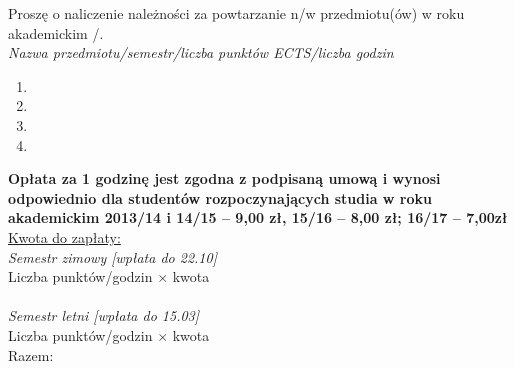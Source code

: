 \documentclass{wmiisubmission}
\begin{document}
\cracowdate
{}
\studentaddress
\addressee[-1em]{\piotrniemiec}

\vskip 1.5cm

Proszę o naliczenie należności za powtarzanie n/w przedmiotu(ów) w roku\\
akademickim \fillField{1cm}/\fillField{1cm}.\\

\textit{Nazwa przedmiotu/semestr/liczba punktów ECTS/liczba godzin}
\begin{enumerate}
    \item \dotfill
    \item \dotfill
    \item \dotfill
    \item \dotfill
\end{enumerate}
{\footnotesize \bf Opłata za 1 godzinę jest zgodna z podpisaną umową i wynosi odpowiednio dla studentów rozpoczynających studia w roku akademickim 2013/14 i 14/15 – 9,00 zł, 15/16 – 8,00 zł; 16/17 – 7,00zł}\\

\underline{Kwota do zapłaty:}\\
\textit{Semestr zimowy [wpłata do 22.10]}\\
Liczba punktów/godzin \dotfill $\times$ kwota \dotfill \\\\
\textit{Semestr letni [wpłata do 15.03]}\\
Liczba punktów/godzin \dotfill $\times$ kwota \dotfill \\

\hspace{\fill} Razem: \fillField{2.5cm} \hspace{2.0cm}

\vskip 0.6cm

\studentsignature

\vskip 1.0cm

\end{document}
